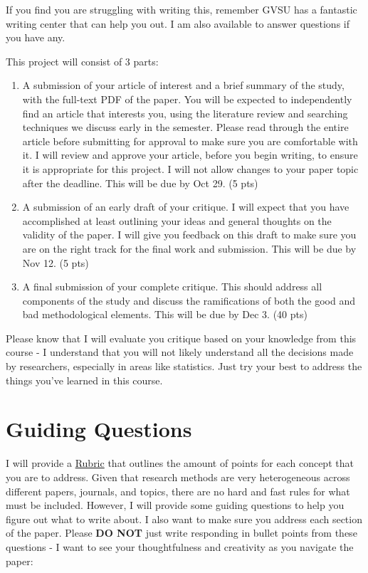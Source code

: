 \documentclass[
  12pt,
  letterpaper,
]{scrartcl}
\begin{document}
If you find you are struggling with writing this, remember GVSU has a
fantastic writing center that can help you out. I am also available to
answer questions if you have any.

This project will consist of 3 parts:

\begin{enumerate}
\def\labelenumi{\arabic{enumi}.}
\item
  A submission of your article of interest and a brief summary of the
  study, with the full-text PDF of the paper. You will be expected to
  independently find an article that interests you, using the literature
  review and searching techniques we discuss early in the semester.
  Please read through the entire article before submitting for approval
  to make sure you are comfortable with it. I will review and approve
  your article, before you begin writing, to ensure it is appropriate
  for this project. I will not allow changes to your paper topic after
  the deadline. This will be due by Oct 29. (5 pts)
\item
  A submission of an early draft of your critique. I will expect that
  you have accomplished at least outlining your ideas and general
  thoughts on the validity of the paper. I will give you feedback on
  this draft to make sure you are on the right track for the final work
  and submission. This will be due by Nov 12. (5 pts)
\item
  A final submission of your complete critique. This should address all
  components of the study and discuss the ramifications of both the good
  and bad methodological elements. This will be due by Dec 3. (40 pts)
\end{enumerate}

Please know that I will evaluate you critique based on your knowledge
from this course - I understand that you will not likely understand all
the decisions made by researchers, especially in areas like statistics.
Just try your best to address the things you've learned in this course.

\section{Guiding Questions}\label{guiding-questions}

I will provide a \hyperref[rubric]{Rubric} that outlines the amount of
points for each concept that you are to address. Given that research
methods are very heterogeneous across different papers, journals, and
topics, there are no hard and fast rules for what must be included.
However, I will provide some guiding questions to help you figure out
what to write about. I also want to make sure you address each section
of the paper. Please \textbf{DO NOT} just write responding in bullet
points from these questions - I want to see your thoughtfulness and
creativity as you navigate the paper:
\end{document}
